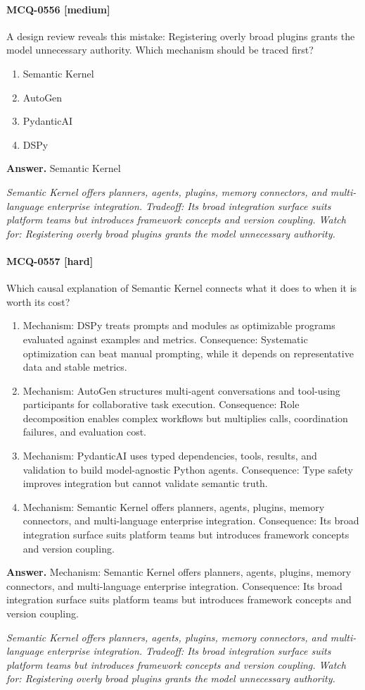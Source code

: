 \paragraph{MCQ-0556 [medium]} A design review reveals this mistake: Registering overly broad plugins grants the model unnecessary authority. Which mechanism should be traced first?
\begin{enumerate}[label=\Alph*.]
\item Semantic Kernel
\item AutoGen
\item PydanticAI
\item DSPy
\end{enumerate}
\noindent\textbf{Answer.} Semantic Kernel
\par\textit{Semantic Kernel offers planners, agents, plugins, memory connectors, and multi-language enterprise integration. Tradeoff: Its broad integration surface suits platform teams but introduces framework concepts and version coupling. Watch for: Registering overly broad plugins grants the model unnecessary authority.}
\paragraph{MCQ-0557 [hard]} Which causal explanation of Semantic Kernel connects what it does to when it is worth its cost?
\begin{enumerate}[label=\Alph*.]
\item Mechanism: DSPy treats prompts and modules as optimizable programs evaluated against examples and metrics. Consequence: Systematic optimization can beat manual prompting, while it depends on representative data and stable metrics.
\item Mechanism: AutoGen structures multi-agent conversations and tool-using participants for collaborative task execution. Consequence: Role decomposition enables complex workflows but multiplies calls, coordination failures, and evaluation cost.
\item Mechanism: PydanticAI uses typed dependencies, tools, results, and validation to build model-agnostic Python agents. Consequence: Type safety improves integration but cannot validate semantic truth.
\item Mechanism: Semantic Kernel offers planners, agents, plugins, memory connectors, and multi-language enterprise integration. Consequence: Its broad integration surface suits platform teams but introduces framework concepts and version coupling.
\end{enumerate}
\noindent\textbf{Answer.} Mechanism: Semantic Kernel offers planners, agents, plugins, memory connectors, and multi-language enterprise integration. Consequence: Its broad integration surface suits platform teams but introduces framework concepts and version coupling.
\par\textit{Semantic Kernel offers planners, agents, plugins, memory connectors, and multi-language enterprise integration. Tradeoff: Its broad integration surface suits platform teams but introduces framework concepts and version coupling. Watch for: Registering overly broad plugins grants the model unnecessary authority.}
